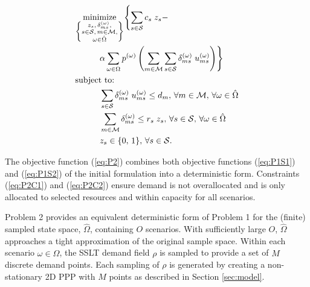 \documentclass[conference]{IEEEtran}
\begin{document}
\vspace{3mm}
\begin{tcolorbox}[title = Problem 2 (Deterministic Equivalent Program of Problem 1)]
\begin{align}
& 
\underset{\left\{ \substack{
	z_s,\, \delta_{ms}^{(\omega)},\\
	s \in \mathcal{S},\, m \in \mathcal{M},\\
	\omega \in \hat{\Omega}} \right\}} {\text{minimize}}
\Biggl\{ \sum_{s \in \mathcal{S}} c_s \; z_s - \nonumber \\
& \hspace{0.4in} \alpha \sum_{\omega \in \Omega} p^{(\omega)} \left( \sum_{m \in \mathcal{M}} \sum_{s \in \mathcal{S}} \delta_{ms}^{(\omega)} \; u_{ms}^{(\omega)} \right) \Biggr\} \label{eq:P2}\\
& \text{subject to:}  \nonumber \\
& \hspace{0.4in} \sum_{s \in \mathcal{S}} \delta_{ms}^{(\omega)} \; u_{ms}^{(\omega)} \leq d_m,\, \forall m \in \mathcal{M},\, \forall \omega \in \hat{\Omega} \label{eq:P2C1}\\
& \hspace{0.4in} \sum_{m \in \mathcal{M}} \delta_{ms}^{(\omega)} \leq r_s \; z_s,\, \forall s \in \mathcal{S},\, \forall \omega \in \hat{\Omega} \label{eq:P2C2}\\
& \hspace{0.4in} z_s \in \{0,\, 1\},\, \forall s \in \mathcal{S}. \label{eq:P2C3}
\end{align}
\end{tcolorbox}
\vspace{3mm}

The objective function (\ref{eq:P2}) combines both objective functions (\ref{eq:P1S1}) and (\ref{eq:P1S2}) of the initial formulation into a deterministic form.  Constraints (\ref{eq:P2C1}) and (\ref{eq:P2C2})	ensure demand is not overallocated and is only allocated to selected resources and within capacity for all scenarios.

Problem 2 provides an equivalent deterministic form of Problem 1 for the (finite) sampled state space, $\hat{\Omega}$, containing $O$ scenarios.  With sufficiently large $O$, $\hat{\Omega}$ approaches a tight approximation of the original sample space.  Within each scenario $\omega \in \hat{\Omega}$, the SSLT demand field $\rho$ is sampled to provide a set of $M$ discrete demand points.  Each sampling of $\rho$ is generated by creating a non-stationary 2D PPP with $M$ points as described in Section \ref{sec:model}.
\end{document}
